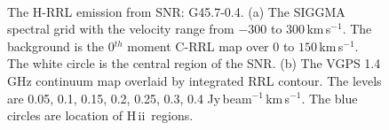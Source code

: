 \documentclass[manuscript]{aastex61}
\newcommand{\hii}{{\rm H\,}{{\sc ii}}}
\newcommand{\kms}{\,km\,s$^{-1}$}
\begin{document}
\begin{figure}[H]
\centering
{}
\\
\caption{The H-RRL emission from SNR: G45.7-0.4.
          (a) The SIGGMA spectral grid with the velocity range from $-300$ to $300$\kms.
	  The background is the 0$^{th}$ moment C-RRL map over $0$ to $150$\kms.
	  The white circle is the central region of the SNR.
	  (b) The VGPS 1.4 GHz continuum map overlaid by integrated RRL contour.
	  The levels are 0.05, 0.1, 0.15, 0.2, 0.25, 0.3, 0.4 Jy\,beam$^{-1}$\kms.
	  The blue circles are location of \hii\ regions.
	  }
\label{fig_snr-g457}
\end{figure}
\end{document}
